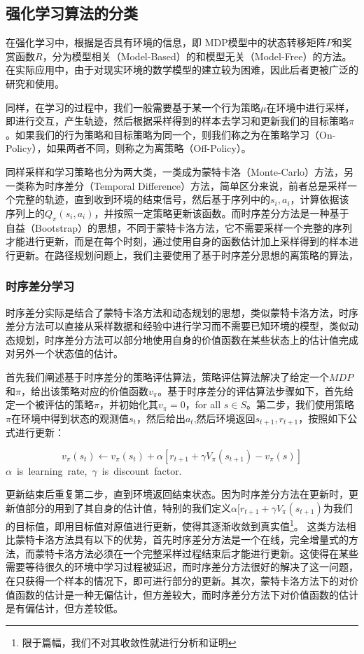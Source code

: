\documentclass{standalone}
\begin{document}
\subsection{强化学习算法的分类}
在强化学习中，根据是否具有环境的信息，即 MDP模型中的状态转移矩阵$P$和奖赏函数$R$，分为模型相关（Model-Based）的和模型无关（Model-Free）的方法。在实际应用中，由于对现实环境的数学模型的建立较为困难，因此后者更被广泛的研究和使用。\par
同样，在学习的过程中，我们一般需要基于某一个行为策略$\mu$在环境中进行采样，即进行交互，产生轨迹，然后根据采样得到的样本去学习和更新我们的目标策略$\pi$。如果我们的行为策略和目标策略为同一个，则我们称之为在策略学习（On-Policy），如果两者不同，则称之为离策略（Off-Policy）。\par
同样采样和学习策略也分为两大类，一类成为蒙特卡洛（Monte-Carlo）方法，另一类称为时序差分（Temporal Difference）方法，简单区分来说，前者总是采样一个完整的轨迹，直到收到环境的结束信号，然后基于序列中的$s_i, a_i$，计算依据该序列上的$Q_{\pi}(s_i, a_i)$，并按照一定策略更新该函数。而时序差分方法是一种基于自益（Bootstrap）的思想，不同于蒙特卡洛方法，它不需要采样一个完整的序列才能进行更新，而是在每个时刻，通过使用自身的函数估计加上采样得到的样本进行更新。在路径规划问题上，我们主要使用了基于时序差分思想的离策略的算法，
\subsubsection{时序差分学习}
时序差分实际是结合了蒙特卡洛方法和动态规划的思想，类似蒙特卡洛方法，时序差分方法可以直接从采样数据和经验中进行学习而不需要已知环境的模型，类似动态规划，时序差分方法可以部分地使用自身的价值函数在某些状态上的估计值完成对另外一个状态值的估计。\par
首先我们阐述基于时序差分的策略评估算法，策略评估算法解决了给定一个$MDP$和$\pi$，给出该策略对应的价值函数$v_{\pi}$。基于时序差分的评估算法步骤如下，首先给定一个被评估的策略$\pi$，并初始化其$v_{\pi} = 0$，for all $s \in S$。第二步，我们使用策略$\pi$在环境中得到状态的观测值$s_t$，然后给出$a_t$,然后环境返回$s_{t+1}, r_{t+1}$，按照如下公式进行更新：
\begin{center}
    \begin{equation}
        v_{\pi}(s_t) \leftarrow v_{\pi}(s_t) + \alpha[r_{t+1} + \gamma V_{\pi}(s_{t+1}) - v_{\pi}(s)]
    \end{equation}
    \mbox{$\alpha$ is learning rate, $\gamma$ is discount factor.}
\end{center}
更新结束后重复第二步，直到环境返回结束状态。因为时序差分方法在更新时，更新值部分的用到了其自身的估计值，特别的我们定义$\alpha[r_{t+1} + \gamma V_{\pi}(s_{t+1})$为我们的目标值，即用目标值对原值进行更新，使得其逐渐收敛到真实值\footnote{限于篇幅，我们不对其收敛性就进行分析和证明}。
这类方法相比蒙特卡洛方法具有以下的优势，首先时序差分方法是一个在线，完全增量式的方法，而蒙特卡洛方法必须在一个完整采样过程结束后才能进行更新。这使得在某些需要等待很久的环境中学习过程被延迟，而时序差分方法很好的解决了这一问题，在只获得一个样本的情况下，即可进行部分的更新。其次，蒙特卡洛方法下的对价值函数的估计是一种无偏估计，但方差较大，而时序差分方法下对价值函数的估计是有偏估计，但方差较低。
\end{document}

